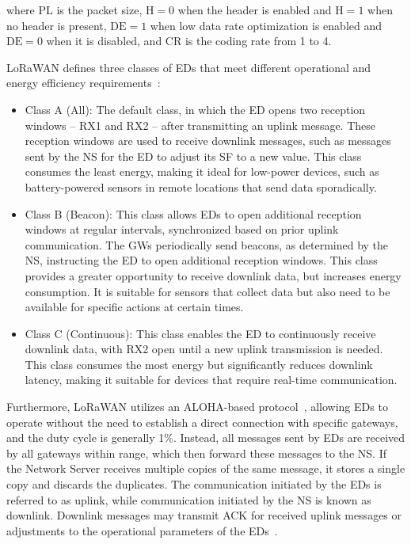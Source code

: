\documentclass[a4paper,fleqn]{cas-dc}
\begin{document}
\noindent where \(\text{PL}\) is the packet size, \(\text{H} = 0\) when the header is enabled and \(\text{H} = 1\) when no header is present, \(\text{DE} = 1\) when low data rate optimization is enabled and \(\text{DE} = 0\) when it is disabled, and \(\text{CR}\) is the coding rate from 1 to 4.

LoRaWAN defines three classes of \gls{EDs} that meet different operational and energy efficiency requirements~\cite{elbsir2023evaluation}:

\begin{itemize}
    \item Class A (All): The default class, in which the ED opens two reception windows -- RX1 and RX2 -- after transmitting an uplink message. These reception windows are used to receive downlink messages, such as messages sent by the \gls{NS} for the ED to adjust its \gls{SF} to a new value. This class consumes the least energy, making it ideal for low-power devices, such as battery-powered sensors in remote locations that send data sporadically.

    \item Class B (Beacon): This class allows \gls{EDs} to open additional reception windows at regular intervals, synchronized based on prior uplink communication. The \gls{GWs} periodically send beacons, as determined by the \gls{NS}, instructing the ED to open additional reception windows. This class provides a greater opportunity to receive downlink data, but increases energy consumption. It is suitable for sensors that collect data but also need to be available for specific actions at certain times.

    \item Class C (Continuous): This class enables the ED to continuously receive downlink data, with RX2 open until a new uplink transmission is needed. This class consumes the most energy but significantly reduces downlink latency, making it suitable for devices that require real-time communication.
\end{itemize}

Furthermore, \gls{LoRaWAN} utilizes an ALOHA-based protocol~\cite{heusse2023lorawan}, allowing \gls{EDs} to operate without the need to establish a direct connection with specific gateways, and the duty cycle is generally 1\%. Instead, all messages sent by \gls{EDs} are received by all gateways within range, which then forward these messages to the \gls{NS}. If the Network Server receives multiple copies of the same message, it stores a single copy and discards the duplicates. The communication initiated by the \gls{EDs} is referred to as uplink, while communication initiated by the \gls{NS} is known as downlink. Downlink messages may transmit \gls{ACK} for received uplink messages or adjustments to the operational parameters of the \gls{EDs}~\cite{marini2022lpwan}.
\end{document}
